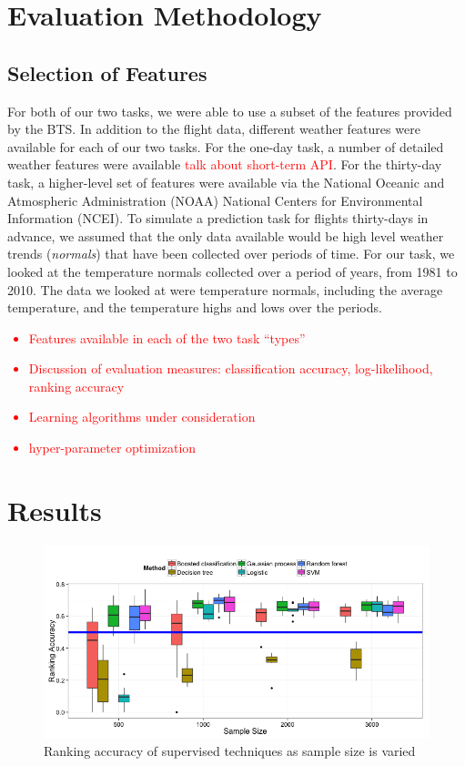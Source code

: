 \documentclass{article}
\begin{document}
\section{Evaluation Methodology}
\label{sec:evaluation-methodology}
\subsection{Selection of Features}

For both of our two tasks, we were able to use a subset of the features provided by the BTS. In addition to the flight data, different weather features were available for each of our two tasks. For the one-day task, a number of detailed weather features were available \textcolor{red}{talk about short-term API}. For the thirty-day task, a higher-level set of features were available via the National Oceanic and Atmospheric Administration (NOAA) National Centers for Environmental Information (NCEI)\cite{noaaclimatedata}. To simulate a prediction task for flights thirty-days in advance, we assumed that the only data available would be high level weather trends (\emph{normals}) that have been collected over periods of time. For our task, we looked at the temperature normals collected over a period of years, from 1981 to 2010. The data we looked at were temperature normals, including the average temperature, and the temperature highs and lows over the periods. 
\textcolor{red}{
    \begin{itemize}
        \item Features available in each of the two task ``types''
        \item Discussion of evaluation measures: classification accuracy, log-likelihood, ranking accuracy
        \item Learning algorithms under consideration
        \item hyper-parameter optimization
    \end{itemize}
}

\section{Results}
\label{sec:results}

\begin{figure}
    \centering
    \includegraphics[width=\textwidth]{figures/performance-by-sample-size.png}
    \caption{Ranking accuracy of supervised techniques as sample size is varied}
\end{figure}




\end{document}
